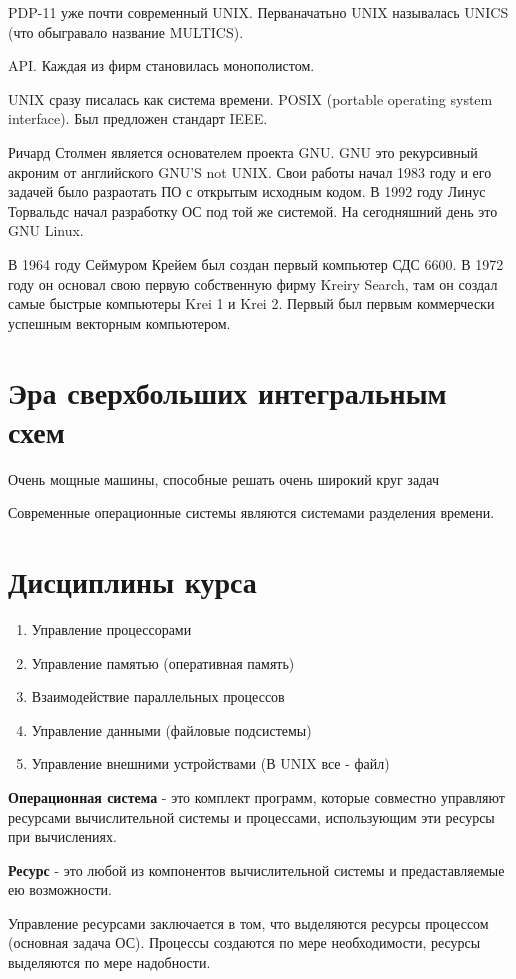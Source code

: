 \documentclass[a4paper, 14pt]{report}
\begin{document}
    PDP-11 уже почти современный UNIX. Перваначатьно UNIX называлась UNICS (что обыгравало название MULTICS).

    API. Каждая из фирм становилась монополистом.

    UNIX сразу писалась как система времени. POSIX (portable operating system interface). Был предложен стандарт IEEE.

    Ричард Столмен является основателем проекта GNU. GNU это рекурсивный акроним от английского GNU'S not UNIX. Свои работы начал 1983 году и его задачей было разраотать ПО с открытым исходным кодом. В 1992 году Линус Торвальдс начал разработку ОС под той же системой. На сегодняшний день это GNU Linux.

    В 1964 году Сеймуром Крейем был создан первый компьютер СДС 6600. В 1972 году он основал свою первую собственную фирму Kreiry Search, там он создал самые быстрые компьютеры Krei 1 и Krei 2. Первый был первым коммерчески успешным векторным компьютером.

    \section{Эра сверхбольших интегральным схем}

    Очень мощные машины, способные решать очень широкий круг задач

    Современные операционные системы являются системами разделения времени.

    \section{Дисциплины курса}

    \begin{enumerate}
        \item Управление процессорами
        \item Управление памятью (оперативная память)
        \item Взаимодействие параллельных процессов
        \item Управление данными (файловые подсистемы)
        \item Управление внешними устройствами (В UNIX все - файл)
    \end{enumerate}

    \textbf{Операционная система} - это комплект программ, которые совместно управляют ресурсами вычислительной системы и процессами, использующим эти ресурсы при вычислениях.

    \textbf{Ресурс} - это любой из компонентов вычислительной системы и предаставляемые ею возможности.

    Управление ресурсами заключается в том, что выделяются ресурсы процессом (основная задача ОС). Процессы создаются по мере необходимости, ресурсы выделяются по мере надобности.
\end{document}
